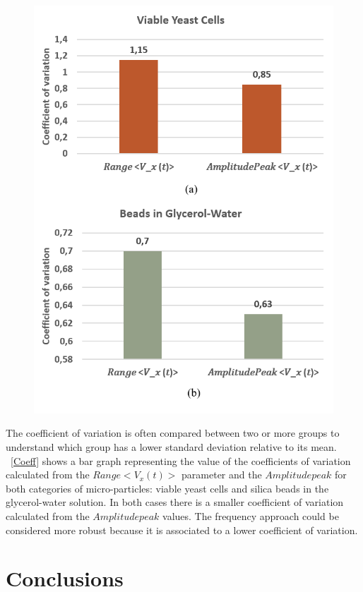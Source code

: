 \documentclass[journal]{IEEEtran}
\theoremstyle{definition}
\theoremstyle{remark}
\begin{document}
\begin{figure}[t]
	\centering
	\includegraphics[width=1\columnwidth]{images/Coeff}
\end{figure}

The coefficient of variation is often compared between two or more groups to understand which group has a lower standard deviation relative to its mean. 
\\~\fig\ref{Coeff} shows a bar graph representing the value of the coefficients of variation calculated from the $Range<V_x(t)>$ parameter and the $Amplitude peak$ for both categories of micro-particles: viable yeast cells and silica beads in the glycerol-water solution. 
In both cases there is a smaller coefficient of variation calculated from the $Amplitude peak$ values. The frequency approach could be considered more robust because it is associated to a lower coefficient of variation.

\section{Conclusions}



%
\end{document}
